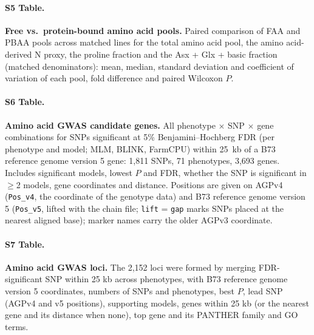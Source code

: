 \paragraph*{S5 Table.}
\makeatletter
\def\@currentlabelname{S5 Table}
\makeatother
\label{S5_Table}
\textbf{Free vs.\ protein-bound amino acid pools.} Paired comparison of FAA and PBAA pools across matched lines for the total amino acid pool, the amino acid-derived N proxy, the proline fraction and the Asx + Glx + basic fraction (matched denominators): mean, median, standard deviation and coefficient of variation of each pool, fold difference and paired Wilcoxon $P$.

\paragraph*{S6 Table.}
\makeatletter
\def\@currentlabelname{S6 Table}
\makeatother
\label{S6_Table}
\textbf{Amino acid GWAS candidate genes.} All phenotype $\times$ SNP $\times$ gene combinations for SNPs significant at 5\% Benjamini--Hochberg FDR (per phenotype and model; MLM, BLINK, FarmCPU) within 25~kb of a B73 reference genome version 5 gene: 1,811 SNPs, 71 phenotypes, 3,693 genes. Includes significant models, lowest $P$ and FDR, whether the SNP is significant in $\geq$2 models, gene coordinates and distance. Positions are given on AGPv4 (\texttt{Pos\_v4}, the coordinate of the genotype data) and B73 reference genome version 5 (\texttt{Pos\_v5}, lifted with the chain file; \texttt{lift} = \texttt{gap} marks SNPs placed at the nearest aligned base); marker names carry the older AGPv3 coordinate.

\paragraph*{S7 Table.}
\makeatletter
\def\@currentlabelname{S7 Table}
\makeatother
\label{S7_Table}
\textbf{Amino acid GWAS loci.} The 2,152 loci were formed by merging FDR-significant SNP within 25 kb across phenotypes, with B73 reference genome version 5 coordinates, numbers of SNPs and phenotypes, best $P$, lead SNP (AGPv4 and v5 positions), supporting models, genes within 25 kb (or the nearest gene and its distance when none), top gene and its PANTHER family and GO terms.

